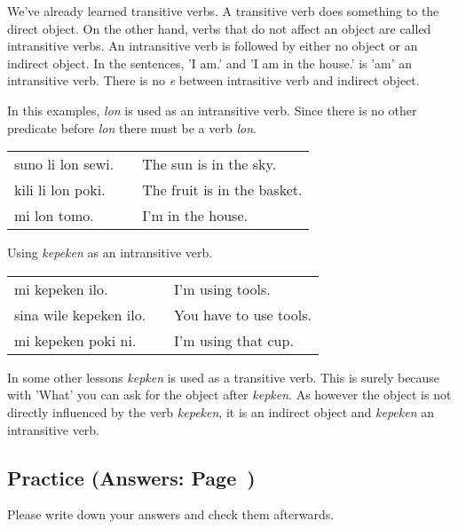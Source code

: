We've already learned transitive verbs. 
A transitive verb does something to the direct object. 
On the other hand, verbs that do not affect an object are called intransitive verbs. 
An intransitive verb is followed by either no object or an indirect object. 
In the sentences, 'I am.' and 'I am in the house.' is 'am' an intransitive verb. 
There is no \textit{e} between intrasitive verb and indirect object.

%
In this examples, \textit{lon} is used as an intransitive verb. 
Since there is no other predicate before \textit{lon} there must be a verb \textit{lon}.

\begin{supertabular}{p{5,5cm}|ll}
suno li lon sewi. && The sun is in the sky. \\
kili li lon poki. && The fruit is in the basket. \\
mi lon tomo. && I'm in the house. \\
\end{supertabular} 

%
Using \textit{kepeken} as an intransitive verb.
 
\begin{supertabular}{p{5,5cm}|ll}
mi kepeken ilo. && I'm using tools. \\
sina wile kepeken ilo. && You have to use tools. \\
mi kepeken poki ni. && I'm using that cup. \\
\end{supertabular} 

In some other lessons \textit{kepken} is used as a transitive verb.
This is surely because with 'What' you can ask for the object after \textit{kepken}. 
As however the object is not directly influenced by the verb \textit{kepeken}, it is an indirect object and \textit{kepeken} an intransitive verb. 









%
\newpage
\subsection*{Practice (Answers: Page~\pageref{'indirect_objects'})}
%
Please write down your answers and check them afterwards. 

